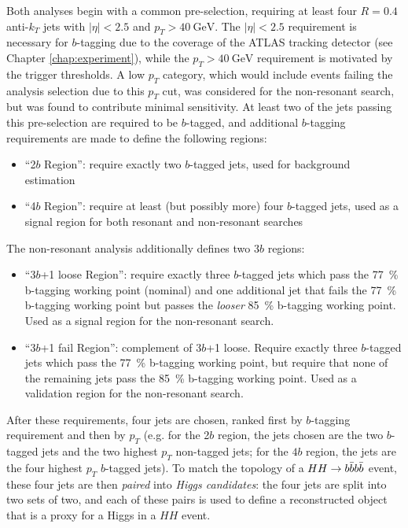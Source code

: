 Both analyses begin with a common pre-selection, requiring at least four $R=0.4$ anti-$k_{T}$ jets with 
$|\eta| < 2.5$ and $p_{T} > \SI{40}{\GeV}$. The $|\eta| < 2.5$ requirement is necessary for $b$-tagging
due to the coverage of the ATLAS tracking detector (see Chapter \ref{chap:experiment}), 
while the $p_{T} > \SI{40}{\GeV}$ requirement is motivated by the trigger thresholds. A low $p_{T}$ category, 
which would include events failing the analysis selection due to this $p_{T}$ cut, 
was considered for the non-resonant search, but was found to contribute minimal sensitivity.
At least two of the jets passing this pre-selection are required to be $b$-tagged, and additional $b$-tagging 
requirements are made to define the following regions:
\begin{itemize}
	\item ``2$b$ Region'': require exactly two $b$-tagged jets, used for background estimation
	\item ``4$b$ Region'': require at least (but possibly more) four $b$-tagged jets, used as a signal
	region for both resonant and non-resonant searches
\end{itemize}

The non-resonant analysis additionally defines two $3b$ regions:
\begin{itemize}
	\item ``3$b$+1 loose Region'': require exactly three $b$-tagged jets which 
	pass the 77~\% b-tagging working point (nominal) and one additional jet that fails the  
	77~\% b-tagging working point but passes the \emph{looser} 85~\% b-tagging working point. Used 
	as a signal region for the non-resonant search.
	\item ``3$b$+1 fail Region'': complement of 3$b$+1 loose. Require exactly three $b$-tagged jets 
	which pass the 77~\% b-tagging working point, but require that none of the remaining jets pass 
	the 85~\% b-tagging working point. Used as a validation region for the non-resonant search.
\end{itemize}
After these requirements, four jets are chosen, ranked first by $b$-tagging requirement and then 
by $p_{T}$ (e.g. for the 2$b$ region, the jets chosen are the two $b$-tagged jets and the two 
highest $p_{T}$ non-tagged jets; for the $4b$ region, the jets are the four highest $p_{T}$ $b$-tagged
jets). To match the topology of a $HH\rightarrow b\bar{b}b\bar{b}$ event, these four jets are then \emph{paired}
into \emph{Higgs candidates}: the four jets are split into two sets of two, and each of these pairs is
used to define a reconstructed object that is a proxy for a Higgs in a $HH$ event.

